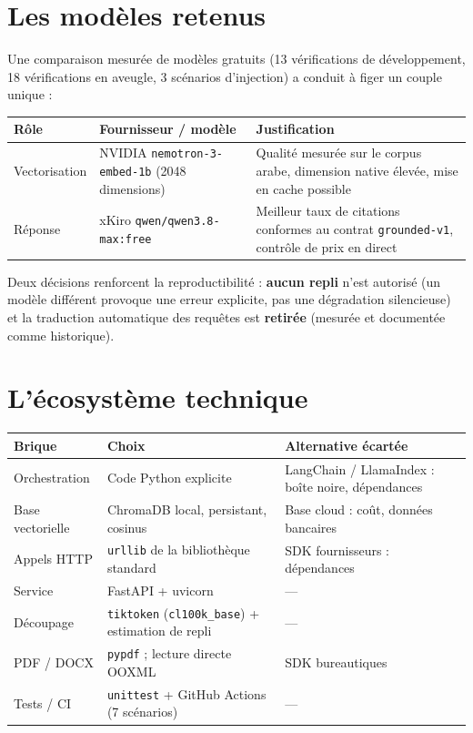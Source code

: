 \documentclass[a4paper,12pt]{report}
\begin{document}
\section{Les modèles retenus}
Une comparaison mesurée de modèles gratuits (13 vérifications de développement, 18 vérifications
en aveugle, 3 scénarios d'injection) a conduit à figer un couple unique :

\begin{table}[H]
\centering
\small
\begin{tabular}{p{2.6cm}p{5.3cm}p{6.3cm}}
\toprule
\textbf{Rôle} & \textbf{Fournisseur / modèle} & \textbf{Justification} \\
\midrule
Vectorisation & NVIDIA \texttt{nemotron-3-embed-1b} (2048 dimensions) & Qualité mesurée sur le
corpus arabe, dimension native élevée, mise en cache possible \\
Réponse & xKiro \texttt{qwen/qwen3.8-max:free} & Meilleur taux de citations conformes au contrat
\texttt{grounded-v1}, contrôle de prix en direct \\
\bottomrule
\end{tabular}
\end{table}

Deux décisions renforcent la reproductibilité : \textbf{aucun repli} n'est autorisé (un modèle
différent provoque une erreur explicite, pas une dégradation silencieuse) et la traduction
automatique des requêtes est \textbf{retirée} (mesurée et documentée comme historique).

\section{L'écosystème technique}
\begin{table}[H]
\centering
\small
\begin{tabular}{p{3.2cm}p{5.6cm}p{5.4cm}}
\toprule
\textbf{Brique} & \textbf{Choix} & \textbf{Alternative écartée} \\
\midrule
Orchestration & Code Python explicite & LangChain / LlamaIndex : boîte noire, dépendances \\
Base vectorielle & ChromaDB local, persistant, cosinus & Base cloud : coût, données bancaires \\
Appels HTTP & \texttt{urllib} de la bibliothèque standard & SDK fournisseurs : dépendances \\
Service & FastAPI + uvicorn & — \\
Découpage & \texttt{tiktoken} (\texttt{cl100k\_base}) + estimation de repli & — \\
PDF / DOCX & \texttt{pypdf} ; lecture directe OOXML & SDK bureautiques \\
Tests / CI & \texttt{unittest} + GitHub Actions (7 scénarios) & — \\
\bottomrule
\end{tabular}
\end{table}
\end{document}
